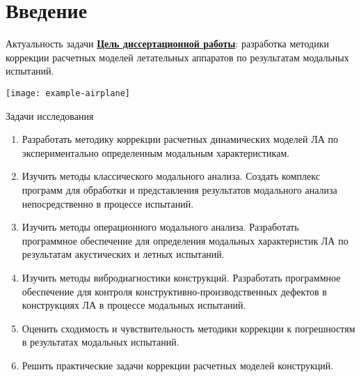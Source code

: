 
\begin{frame}
    \setcounter{framenumber}{1}
    \maketitle
\end{frame}

\section{Введение}

\begin{frame}{Актуальность задачи}
	\textbf{\underline{Цель диссертационной работы}}: разработка методики коррекции расчетных моделей летательных аппаратов по результатам модальных испытаний.
	\begin{center}
		\texttt{[image: example-airplane]}
	\end{center}
\end{frame}

\begin{frame}{Задачи исследования}
	\begin{enumerate}
		\item Разработать методику коррекции расчетных динамических моделей ЛА по экспериментально определенным модальным характеристикам.
		\item Изучить методы классического модального анализа. Создать комплекс программ для обработки и представления результатов модального анализа непосредственно в процессе испытаний.
		\item Изучить методы операционного модального анализа. Разработать программное обеспечение для определения модальных характеристик ЛА по результатам акустических и летных испытаний.
		\item Изучить методы вибродиагностики конструкций. Разработать программное обеспечение для контроля конструктивно-производственных дефектов в конструкциях ЛА в процессе модальных испытаний.
		\item Оценить сходимость и чувствительность методики коррекции к погрешностям в результатах модальных испытаний.
		\item Решить практические задачи коррекции расчетных моделей конструкций.
	\end{enumerate}
\end{frame}

